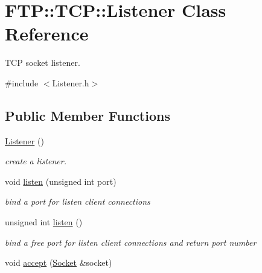 \hypertarget{classFTP_1_1TCP_1_1Listener}{}\section{F\+T\+P\+:\+:T\+C\+P\+:\+:Listener Class Reference}
\label{classFTP_1_1TCP_1_1Listener}


T\+C\+P socket listener.  




{\ttfamily \#include $<$Listener.\+h$>$}

\subsection*{Public Member Functions}
\begin{DoxyCompactItemize}
\item 
\hypertarget{classFTP_1_1TCP_1_1Listener_a69e4e544dd49c56e1d2cac10a314d90a}{}\hyperlink{classFTP_1_1TCP_1_1Listener_a69e4e544dd49c56e1d2cac10a314d90a}{Listener} ()\label{classFTP_1_1TCP_1_1Listener_a69e4e544dd49c56e1d2cac10a314d90a}

\begin{DoxyCompactList}\small\item\em create a listener. \end{DoxyCompactList}\item 
\hypertarget{classFTP_1_1TCP_1_1Listener_aafa6fa407abdfd638db25fb0d610252e}{}void \hyperlink{classFTP_1_1TCP_1_1Listener_aafa6fa407abdfd638db25fb0d610252e}{listen} (unsigned int port)\label{classFTP_1_1TCP_1_1Listener_aafa6fa407abdfd638db25fb0d610252e}

\begin{DoxyCompactList}\small\item\em bind a port for listen client connections \end{DoxyCompactList}\item 
\hypertarget{classFTP_1_1TCP_1_1Listener_abd151bda4845bec6533c75667499c21f}{}unsigned int \hyperlink{classFTP_1_1TCP_1_1Listener_abd151bda4845bec6533c75667499c21f}{listen} ()\label{classFTP_1_1TCP_1_1Listener_abd151bda4845bec6533c75667499c21f}

\begin{DoxyCompactList}\small\item\em bind a free port for listen client connections and return port number \end{DoxyCompactList}\item 
\hypertarget{classFTP_1_1TCP_1_1Listener_a2c3b3f387f91f07e4e3508ebba73c7c2}{}void \hyperlink{classFTP_1_1TCP_1_1Listener_a2c3b3f387f91f07e4e3508ebba73c7c2}{accept} (\hyperlink{classFTP_1_1TCP_1_1Socket}{Socket} \&socket)\label{classFTP_1_1TCP_1_1Listener_a2c3b3f387f91f07e4e3508ebba73c7c2}


\end{DoxyCompactItemize}

